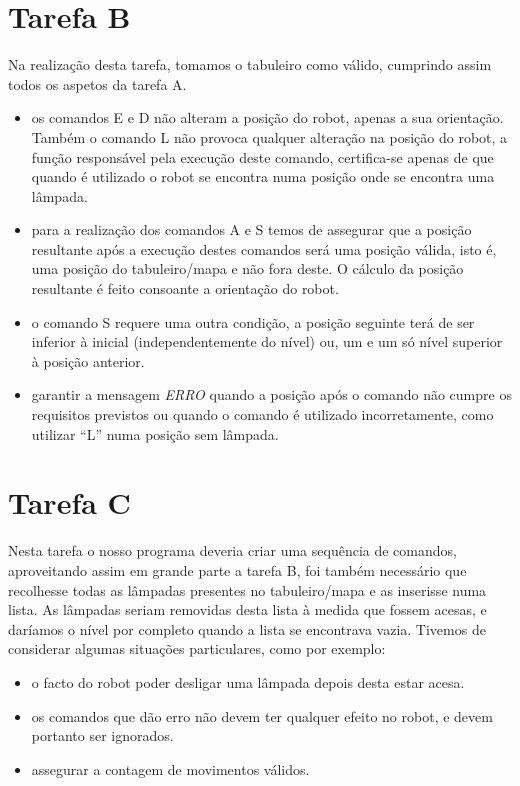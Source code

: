 \documentclass[a4paper,12pt]{report}
\begin{document}
\section{Tarefa B}
Na realização desta tarefa, tomamos o tabuleiro como válido, cumprindo assim todos os aspetos da tarefa A.

\begin{itemize}
\item os comandos E e D não alteram a posição do robot, apenas a sua orientação. Também o comando L não provoca qualquer alteração na posição do robot, a função responsável pela execução deste comando, certifica-se apenas de que quando é utilizado o robot se encontra numa posição onde se encontra uma lâmpada.
\item para a realização dos comandos A e S temos de assegurar que a posição resultante após a execução destes comandos será uma posição válida, isto é, uma posição do tabuleiro/mapa e não fora deste. O cálculo da posição resultante é feito consoante a orientação do robot.
\item o comando S requere uma outra condição, a posição seguinte terá de ser inferior à inicial (independentemente do nível) ou, um e um só nível superior à posição anterior.
\item garantir a mensagem \emph{ERRO} quando a posição após o comando não cumpre os requisitos previstos ou quando o comando é utilizado incorretamente, como utilizar “L” numa posição sem lâmpada.
\end{itemize}

\section{Tarefa C}
Nesta tarefa o nosso programa deveria criar uma sequência de comandos, aproveitando assim em grande parte a tarefa B, foi também necessário que recolhesse todas as lâmpadas presentes no tabuleiro/mapa e as inserisse numa lista. As lâmpadas seriam removidas desta lista à medida que fossem acesas, e daríamos o nível por completo quando a lista se encontrava vazia.
Tivemos de considerar algumas situações particulares, como por exemplo:
\begin{itemize}
\item o facto do robot poder desligar uma lâmpada depois desta estar acesa.
\item os comandos que dão erro não devem ter qualquer efeito no robot, e devem portanto ser ignorados. 
\item assegurar a contagem de movimentos válidos.
\end{itemize}
\end{document}
